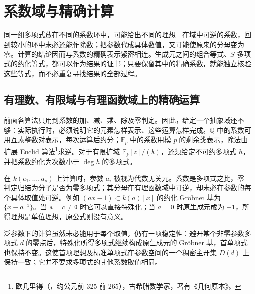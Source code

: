 
\section{系数域与精确计算}
\label{b3:sec:0804}


同一组多项式放在不同的系数环中，可能给出不同的理想：在域中可逆的系数，回到较小的环中未必还能作除数；把参数代成具体数值，又可能使原来的分母变为零。计算的结论因而与系数的精确表示紧密相连。生成元之间的组合等式、\(S\)-多项式的约化等式，都可以作为结果的证书；只要保留其中的精确系数，就能独立核验这些等式，而不必重复寻找结果的全部过程。

\subsection{有理数、有限域与有理函数域上的精确运算}
\label{b3:subsec:0804:01}

前面各算法只用到系数的加、减、乘、除及零判定。因此，给定一个抽象域还不够：实际执行时，必须说明它的元素怎样表示、这些运算怎样完成。\(\mathbb Q\) 中的系数可用互素整数对表示，每次运算后约分；\(\mathbb F_p\) 中的系数用模 \(p\) 的剩余类表示，除法由扩展 Euclid 算法\footnote{欧几里得（，约公元前 325-前 265），古希腊数学家，著有《几何原本》。}求逆。对于有限扩域 \(\mathbb F_p[z]/(h)\)，还须给定不可约多项式 \(h\)，并把系数约化为次数小于 \(\deg h\) 的多项式。

\ProseParagraphBreak
在 \(k(a_1,\ldots,a_s)\) 上计算时，参数 \(a_i\) 被视为代数无关元。系数是多项式之比，零判定归结为分子是否为零多项式；其分母在有理函数域中可逆，却未必在参数的每个具体取值处可逆。例如 \((ax-1)\subset k(a)[x]\) 的约化 Gröbner 基为 \(\{x-a^{-1}\}\)。当 \(a=c\ne0\) 时它可以直接特殊化；当 \(a=0\) 时原生成元成为 \(-1\)，所得理想是单位理想，原公式则没有意义。

泛参数下的计算虽然未必能用于每个取值，仍有一项稳定性：避开某个非零参数多项式 \(d\) 的零点后，特殊化所得多项式继续构成原生成元的 Gröbner 基，首单项式也保持不变。这使首项理想及标准单项式在参数空间的一个稠密主开集 \(D(d)\) 上保持一致；它并不要求多项式的其他系数取值相同。

